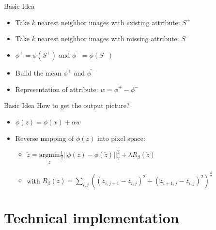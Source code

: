 \documentclass[11pt]{beamer}
\begin{document}
\begin{frame}{Basic Idea}
	\begin{itemize}
		
		\setlength\itemsep{1em}
		\item Take $k$ nearest neighbor images with existing attribute: $S^+$
		\item Take $k$ nearest neighbor images with missing attribute: $S^-$
		\vfill
		\pause
		
		\item $\phi^+ = \phi(S^+)$ and $\phi^- = \phi(S^-)$
		\item Build the mean $\overline{\phi^+}$ and $\overline{\phi^-}$
		\vfill
		\pause 
		
		\item Representation of attribute: $w=\overline{\phi^+}-\overline{\phi^-}$
	\end{itemize}
\end{frame}

\begin{frame}{Basic Idea}
	How to get the output picture?
	
	\vfill
	\pause
	
	\begin{itemize}
		
		\setlength\itemsep{1em}
		\item $\phi(z) = \phi(x) + \alpha w$
		\item Reverse mapping of $\phi(z)$ into pixel space:
		
		\vfill
		\pause
		\begin{itemize}
			
			\setlength\itemsep{1em}
			\item $\tilde{z} = \underset{\tilde{z}}{\mathrm{argmin}} \frac{1}{2} ||\phi(z)-\phi(\tilde{z})||_2^2 + \lambda R_{\beta}(\tilde{z})$ 
			\item with $R_{\beta}(\tilde{z}) = \sum_{i,j}((\tilde{z}_{i,j+1}-\tilde{z}_{i,j})^2 + (\tilde{z}_{i+1,j}-\tilde{z}_{i,j})^2)^{\frac{\beta}{2}}$
		\end{itemize}
		 
	\end{itemize}
	
\end{frame}

\section{Technical implementation}
\end{document}
